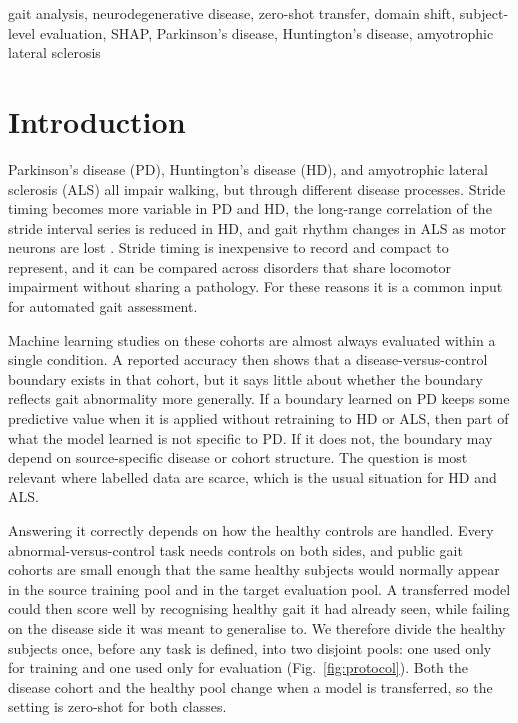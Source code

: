 \documentclass[conference]{IEEEtran}
\begin{document}
\begin{IEEEkeywords}
gait analysis, neurodegenerative disease, zero-shot transfer, domain shift, subject-level evaluation, SHAP, Parkinson's disease, Huntington's disease, amyotrophic lateral sclerosis
\end{IEEEkeywords}

\section{Introduction}
\label{sec:intro}
Parkinson's disease (PD), Huntington's disease (HD), and amyotrophic lateral sclerosis (ALS) all impair walking, but through different disease processes. Stride timing becomes more variable in PD and HD, the long-range correlation of the stride interval series is reduced in HD, and gait rhythm changes in ALS as motor neurons are lost \cite{hausdorff1997fractal,hausdorff1998variability,hausdorff2000als}. Stride timing is inexpensive to record and compact to represent, and it can be compared across disorders that share locomotor impairment without sharing a pathology. For these reasons it is a common input for automated gait assessment.

Machine learning studies on these cohorts are almost always evaluated within a single condition. A reported accuracy then shows that a disease-versus-control boundary exists in that cohort, but it says little about whether the boundary reflects gait abnormality more generally. If a boundary learned on PD keeps some predictive value when it is applied without retraining to HD or ALS, then part of what the model learned is not specific to PD. If it does not, the boundary may depend on source-specific disease or cohort structure. The question is most relevant where labelled data are scarce, which is the usual situation for HD and ALS.

Answering it correctly depends on how the healthy controls are handled. Every abnormal-versus-control task needs controls on both sides, and public gait cohorts are small enough that the same healthy subjects would normally appear in the source training pool and in the target evaluation pool. A transferred model could then score well by recognising healthy gait it had already seen, while failing on the disease side it was meant to generalise to. We therefore divide the healthy subjects once, before any task is defined, into two disjoint pools: one used only for training and one used only for evaluation (Fig.~\ref{fig:protocol}). Both the disease cohort and the healthy pool change when a model is transferred, so the setting is zero-shot for both classes.
\end{document}
